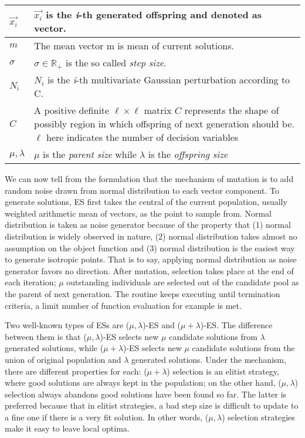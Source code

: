 \begin{center}
  \begin{tabular}{|>{\centering} m{0.7in} | m{4.2in}|} \hline
    $\vec{x_i}$    & $\vec{x_i}$ is the \textit{i}-th generated
    offspring and denoted as vector.\\\hline $m$      & The mean vector
    m is mean of current solutions.\\\hline $\sigma$ &  $\sigma \in
    \mathbb{R}_+$ is the so called \emph{step size}.\\\hline $N_i$    &
    $N_i$ is the \textit{i}-th multivariate Gaussian perturbation
    according to C.\\\hline $C$      & A positive definite $\ell \times
    \ell$ matrix $C$ represents the shape of possibly region in which
    offspring of next generation should be.$\ell$ here indicates the
    number of decision variables\\\hline $\mu,\lambda$ & $\mu$ is the
    \emph{parent size} while $\lambda$ is the \emph{offspring
    size}\\\hline \end{tabular} \end{center}

We can now tell from the formulation that the mechanism of mutation is
to add random noise drawn from normal distribution to each vector
component.  To generate solutions, ES first takes the central of the
current population, usually weighted arithmetic mean of vectors, as the
point to sample from.  Normal distribution is taken as noise generator
because of the property that (1) normal distribution is widely observed
in nature, (2) normal distribution takes almost no assumption on the
object function and (3) normal distribution is the easiest way to
generate isotropic points.  That is to say, applying normal distribution
as noise generator favors no direction.  After mutation, selection takes
place at the end of each iteration; $\mu$ outstanding individuals are
selected out of the candidate pool as the parent of next generation.
The routine keeps executing until termination criteria, a limit number
of function evaluation for example is met.

Two well-known types of ESs are ($\mu, \lambda$)-ES and ($\mu+\lambda$)-ES\@.  The difference between them is that ($\mu,
\lambda$)-ES selects new $\mu$ candidate solutions from $\lambda$
generated solutions, while ($\mu+\lambda$)-ES selects new
$\mu$ candidate solutions from the union of original population and
$\lambda$ generated solutions.  Under the mechanism, there are different
properties for each: ($\mu+ \lambda$) selection is an elitist strategy,
where good solutions are always kept in the population; on the other
hand, ($\mu,\lambda$) selection always abandons good solutions have been
found so far.  The latter is preferred because that in elitist
strategies, a bad step size is difficult to update to a fine one if
there is a very fit solution.  In other words, ($\mu, \lambda$)
selection strategies make it easy to leave local optima.

